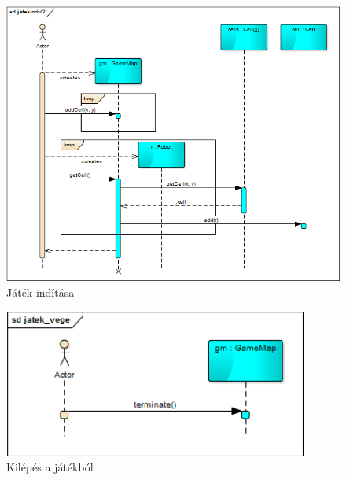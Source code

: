 \begin{figure}[!htbp]
	\begin{center}
		\includegraphics[width=14cm]{./chapters/chapter05/gamestart.png}
		\caption{Játék indítása}
	\end{center}
\end{figure}

\begin{figure}[!htbp]
	\begin{center}
		\includegraphics[width=10cm]{./chapters/chapter05/game_end.png}
		\caption{Kilépés a játékból}
	\end{center}
\end{figure}

